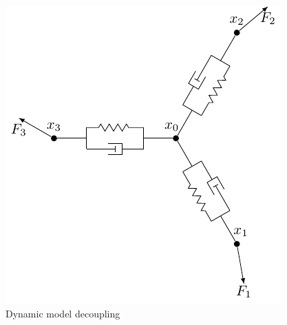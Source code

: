 \documentclass[letterpaper, 10 pt, conference]{ieeeconf}
\begin{document}
\begin{figure}
  \centering
  \includegraphics[scale=0.6]{figures/schematic.pdf}
  \caption{Dynamic model decoupling}
  \label{2D_schematic}
\end{figure}
\end{document}
